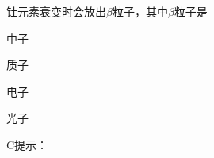 钍元素衰变时会放出\(\beta\)粒子，其中\(\beta\)粒子是\paren[]
\begin{choices}
	\item 中子
	\item 质子
	\item 电子
	\item 光子
\end{choices}
\begin{answer}
    C\qquad 提示：
\end{answer}